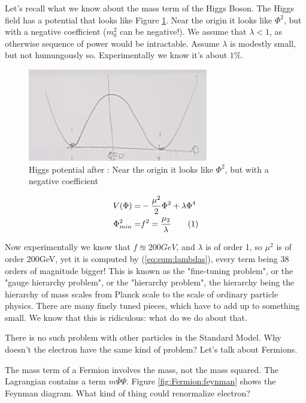 \documentclass[]{article}
\newcommand\numberthis{\addtocounter{equation}{1}\tag{\theequation}}
\begin{document}
Let's recall what we know about the mass term of the Higgs Boson. The Higgs field has a potential that looks like Figure \ref{fig:higgs-potential}. Near the origin it looks like $\Phi^2$, but with a negative coefficient ($m_0^2$ can be negative!). We assume that $\lambda<1$, as otherwise sequence of power would be intractable. Assume $\lambda$ is modestly small, but not humungously so. Experimentally we know it's about $1\%$.

\begin{figure}[H]
	\caption[Higgs potential]{Higgs potential after \cite{susskind2010standard}: Near the origin it looks like $\Phi^2$, but with a negative coefficient }\label{fig:higgs-potential}
	\includegraphics{higgs-potential}
\end{figure}

\begin{align*}
	V(\Phi) =& - \frac{\mu^2}{2} \Phi^2 + \lambda \Phi^4\\
	\Phi_{min}^2 =& f^2 = \frac{\mu_2}{\lambda} \numberthis \label{eg:higgs:minimum}
\end{align*}

Now experimentally we know that $f\approxeq200GeV$, and $\lambda$ is of order 1, so $\mu^2$ is of order 200GeV, yet it is computed by (\ref{eq:sum:lambdas}), every term being 38 orders of magnitude bigger! This is known as the "fine-tuning problem", or the "gauge hierarchy problem", or the "hierarchy problem", the hierarchy being the hierarchy of mass scales from Planck scale to the scale of ordinary particle physics. There are many finely tuned pieces, which have to add up to something small. We know that this is ridiculous: what do we do about that.

There is no such problem with other particles in the Standard Model. Why doesn't the electron have the same kind of problem? Let's talk about Fermions.

The mass term of a Fermion involves the mass, not the mass squared. The Lagrangian contains a term $m \bar{\Psi} \Psi$. Figure \ref{fig:Fermion:feynman} shows the Feynman diagram. What kind of thing could renormalize electron?
\end{document}
